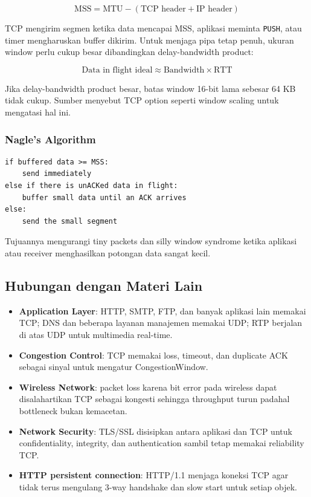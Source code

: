 \[
\text{MSS} = \text{MTU} - (\text{TCP header} + \text{IP header})
\]

TCP mengirim segmen ketika data mencapai MSS, aplikasi meminta \texttt{PUSH}, atau timer mengharuskan buffer dikirim. Untuk menjaga pipa tetap penuh, ukuran window perlu cukup besar dibandingkan delay-bandwidth product:

\[
\text{Data in flight ideal} \approx \text{Bandwidth} \times \text{RTT}
\]

Jika delay-bandwidth product besar, batas window 16-bit lama sebesar 64 KB tidak cukup. Sumber menyebut TCP option seperti window scaling untuk mengatasi hal ini.

\subsubsection*{Nagle's Algorithm}

\begin{lstlisting}[language={},caption={Nagle's Algorithm menurut sumber}]
if buffered data >= MSS:
    send immediately
else if there is unACKed data in flight:
    buffer small data until an ACK arrives
else:
    send the small segment
\end{lstlisting}

Tujuannya mengurangi tiny packets dan silly window syndrome ketika aplikasi atau receiver menghasilkan potongan data sangat kecil.

\subsection{Hubungan dengan Materi Lain}

\begin{itemize}
    \item \textbf{Application Layer}: HTTP, SMTP, FTP, dan banyak aplikasi lain memakai TCP; DNS dan beberapa layanan manajemen memakai UDP; RTP berjalan di atas UDP untuk multimedia real-time.
    \item \textbf{Congestion Control}: TCP memakai loss, timeout, dan duplicate ACK sebagai sinyal untuk mengatur CongestionWindow.
    \item \textbf{Wireless Network}: packet loss karena bit error pada wireless dapat disalahartikan TCP sebagai kongesti sehingga throughput turun padahal bottleneck bukan kemacetan.
    \item \textbf{Network Security}: TLS/SSL disisipkan antara aplikasi dan TCP untuk confidentiality, integrity, dan authentication sambil tetap memakai reliability TCP.
    \item \textbf{HTTP persistent connection}: HTTP/1.1 menjaga koneksi TCP agar tidak terus mengulang 3-way handshake dan slow start untuk setiap objek.
\end{itemize}

